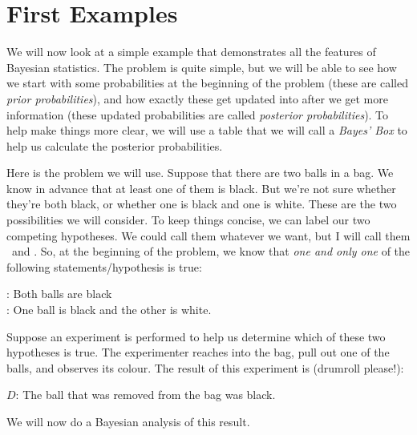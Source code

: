 \chapter{First Examples}
We will now look at a simple example that demonstrates all the features of
Bayesian statistics. The problem is quite simple, but we will be able to see
how we start with some probabilities at the beginning of the problem (these are
called {\it prior probabilities}), and how exactly these get updated
into after we get more information (these updated probabilities are called
{\it posterior probabilities}). To help make things more clear, we will
use a table that we will call a {\it Bayes' Box} to help us calculate the
posterior probabilities.

Here is the problem we will use. Suppose that there are two balls in a bag. We know in advance
that at least one of them is black. But we're not sure whether they're both
black, or whether one is black and one is white. These are the two possibilities
we will consider.
To keep things concise, we
can label our two competing hypotheses. We could call them whatever we want,
but I will call them \bb~and \bw. So, at the beginning of the problem, we know
that {\it one and only one} of the following statements/hypothesis is true:\\
\begin{framed}
\bb: Both balls are black\\
\bw: One ball is black and the other is white.
\end{framed}
Suppose an experiment is performed to help us determine
which of these two hypotheses is
true. The experimenter reaches into the bag, pull out one of the balls, and
observes its colour. The result of this experiment is (drumroll please!):
\begin{framed}
$D$: The ball that was removed from the bag was black.
\end{framed}
We will now do a Bayesian analysis of this result.

